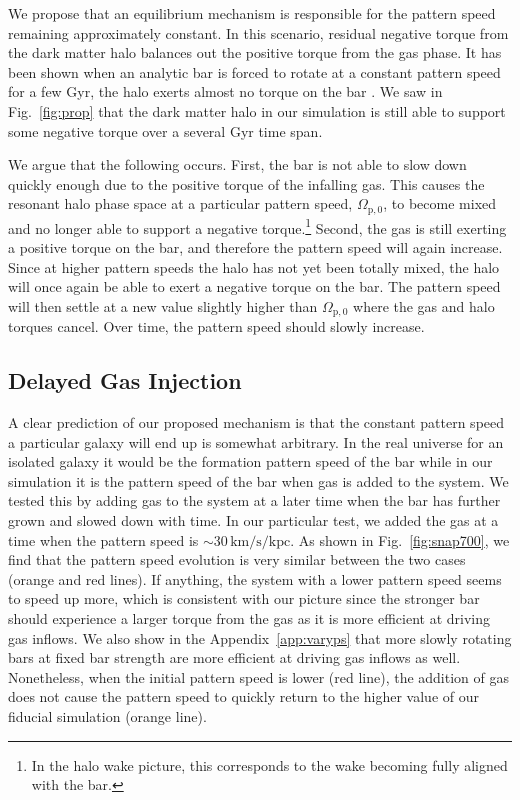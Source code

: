 \documentclass[twocolumn,linenumbers,trackchanges]{aastex631}
\begin{document}

We propose that an equilibrium mechanism is responsible for the pattern speed
remaining approximately constant. In this scenario, residual negative torque
from the dark matter halo balances out the positive torque from the gas phase.
It has been shown when an analytic bar is forced to rotate at a constant pattern
speed for a few Gyr, the halo exerts almost no torque on the bar
\citep{2022MNRAS.513..768C}. We saw in Fig.~\ref{fig:prop} that the dark matter
halo in our simulation is still able to support some negative torque over a
several Gyr time span.

We argue that the following occurs. First, the bar is not able to slow down
quickly enough due to the positive torque of the infalling gas. This causes the
resonant halo phase space at a particular pattern speed,
$\Omega_{\textrm{p},0}$, to become mixed and no longer able to support a
negative torque.\footnote{In the halo wake picture, this corresponds to the wake
becoming fully aligned with the bar.} Second, the gas is still exerting a
positive torque on the bar, and therefore the pattern speed will again increase.
Since at higher pattern speeds the halo has not yet been totally mixed,
the halo will once again be able to exert a negative torque on the bar. The
pattern speed will then settle at a new value slightly higher than
$\Omega_{\textrm{p},0}$ where the gas and halo torques cancel. Over time, the
pattern speed should slowly increase.

\subsection{Delayed Gas Injection}
A clear prediction of our proposed mechanism is that the constant pattern speed
a particular galaxy will end up is somewhat arbitrary. In the real universe for
an isolated galaxy it would be the formation pattern speed of the bar while in
our simulation it is the pattern speed of the bar when gas is added to the
system. We tested this by adding gas to the system at a later time when the bar
has further grown and slowed down with time. In our particular test, we added
the gas at a time when the pattern speed is
$\sim30\,\textrm{km}/\textrm{s}/\textrm{kpc}$. As shown in
Fig.~\ref{fig:snap700}, we find that the pattern speed evolution is very similar
between the two cases (orange and red lines). If anything, the system with a
lower pattern speed seems to speed up more, which is consistent with our picture
since the stronger bar should experience a larger torque from the gas as it is
more efficient at driving gas inflows. We also show in the
Appendix~\ref{app:varyps} that more slowly rotating bars at fixed bar strength
are more efficient at driving gas inflows as well. Nonetheless, when the initial
pattern speed is lower (red line), the addition of gas does not cause the
pattern speed to quickly return to the higher value of our fiducial simulation
(orange line).
\end{document}
